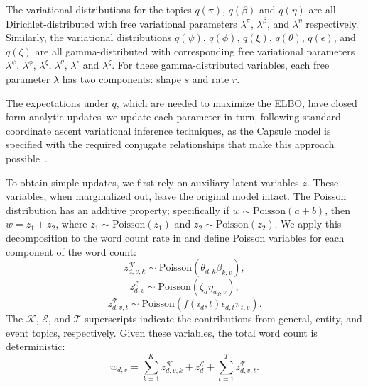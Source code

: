 The variational distributions for the topics $q(\pi)$, $q(\beta)$ and $q(\eta)$ are all Dirichlet-distributed with free variational parameters $\lambda^\pi$, $\lambda^\beta$, and $\lambda^\eta$ respectively.  Similarly, the variational distributions $q(\psi)$, $q(\phi)$, $q(\xi)$, $q(\theta)$, $q(\epsilon)$, and $q(\zeta)$ are all gamma-distributed with corresponding free variational parameters $\lambda^\psi$, $\lambda^\phi$, $\lambda^\xi$, $\lambda^\theta$, $\lambda^\epsilon$ and $\lambda^\zeta$.  For these gamma-distributed variables, each free parameter $\lambda$ has two components: shape $s$ and rate $r$.

The expectations under $q$, which are needed to maximize the ELBO, have closed form analytic updates--we update each parameter in turn, following standard coordinate ascent variational inference techniques, as the Capsule model is specified with the required conjugate relationships that make this approach possible~\cite{Ghahramani:2001}.

To obtain simple updates, we first rely on auxiliary latent variables $z$. These variables, when marginalized out, leave the original model intact. The Poisson distribution has an additive property; specifically if $w \sim \mbox{Poisson}(a+b)$, then $w = z_1 + z_2$, where $z_1 \sim \mbox{Poisson}(z_1)$ and $z_2 \sim \mbox{Poisson}(z_2)$.  We apply this decomposition to the word count rate in  and define Poisson variables for each component of the word count:
\[ z^\mathcal{K}_{d,v,k} \sim \mbox{Poisson}(\theta_{d,k}\beta_{k,v}), \]
\[ z^\mathcal{E}_{d,v} \sim \mbox{Poisson}(\zeta_{d}\eta_{a_d,v}), \]
\[ z^\mathcal{T}_{d,v,t} \sim \mbox{Poisson}\left(f(i_d, t) \epsilon_{d,t} \pi_{t,v}\right). \]
The $\mathcal{K}$, $\mathcal{E}$, and $\mathcal{T}$ superscripts indicate the contributions from general, entity, and event topics, respectively.  Given these variables, the total word count is deterministic:
\[ w_{d,v} = \sum_{k=1}^K z^\mathcal{K}_{d,v,k} + z^\mathcal{E}_{d} + \sum_{t=1}^T z^\mathcal{T}_{d,v,t}. \]

